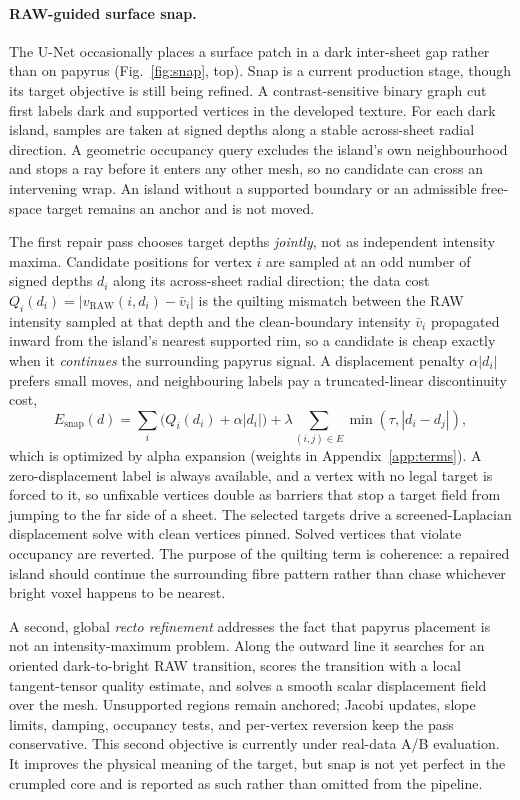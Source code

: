 \paragraph{RAW-guided surface snap.} The U-Net occasionally places a surface patch in a dark inter-sheet gap rather than on papyrus (Fig.~\ref{fig:snap}, top). Snap is a current production stage, though its target objective is still being refined. A contrast-sensitive binary graph cut~\cite{boykov2001fast} first labels dark and supported vertices in the developed texture. For each dark island, samples are taken at signed depths along a stable across-sheet radial direction. A geometric occupancy query excludes the island's own neighbourhood and stops a ray before it enters any other mesh, so no candidate can cross an intervening wrap. An island without a supported boundary or an admissible free-space target remains an anchor and is not moved.

The first repair pass chooses target depths {\em jointly}, not as independent intensity maxima. Candidate positions for vertex $i$ are sampled at an odd number of signed depths $d_i$ along its across-sheet radial direction; the data cost $Q_i(d_i)=|v_{\mathrm{RAW}}(i,d_i)-\bar v_i|$ is the quilting mismatch between the RAW intensity sampled at that depth and the clean-boundary intensity $\bar v_i$ propagated inward from the island's nearest supported rim, so a candidate is cheap exactly when it {\em continues} the surrounding papyrus signal. A displacement penalty $\alpha|d_i|$ prefers small moves, and neighbouring labels pay a truncated-linear discontinuity cost,
\begin{equation*}
 E_{\mathrm{snap}}(d)=\sum_i \bigl(Q_i(d_i)+\alpha |d_i|\bigr)
 +\lambda\!\sum_{(i,j)\in E}\!\min\!\left(\tau,|d_i-d_j|\right),
\end{equation*}
which is optimized by alpha expansion (weights in Appendix~\ref{app:terms}). A zero-displacement label is always available, and a vertex with no legal target is forced to it, so unfixable vertices double as barriers that stop a target field from jumping to the far side of a sheet. The selected targets drive a screened-Laplacian displacement solve with clean vertices pinned. Solved vertices that violate occupancy are reverted. The purpose of the quilting term is coherence: a repaired island should continue the surrounding fibre pattern rather than chase whichever bright voxel happens to be nearest.

A second, global {\em recto refinement} addresses the fact that papyrus placement is not an intensity-maximum problem. Along the outward line it searches for an oriented dark-to-bright RAW transition, scores the transition with a local tangent-tensor quality estimate, and solves a smooth scalar displacement field over the mesh. Unsupported regions remain anchored; Jacobi updates, slope limits, damping, occupancy tests, and per-vertex reversion keep the pass conservative. This second objective is currently under real-data A/B evaluation. It improves the physical meaning of the target, but snap is not yet perfect in the crumpled core and is reported as such rather than omitted from the pipeline.

